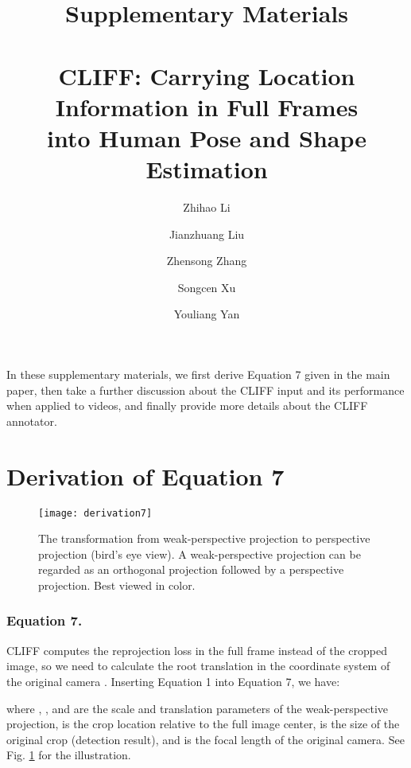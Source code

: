 \documentclass[runningheads]{llncs}
\begin{document}
\title{Supplementary Materials \\
	\scriptsize ~ \\
	\normalsize CLIFF: Carrying Location Information in Full Frames \\
	into Human Pose and Shape Estimation}



\author{
Zhihao Li \and
Jianzhuang Liu \and
Zhensong Zhang \and
Songcen Xu \and
Youliang Yan
}



\maketitle

In these supplementary materials, we first derive Equation 7 given in the main paper, then take a further discussion about the CLIFF input and its performance when applied to videos, and finally provide more details about the CLIFF annotator.

\section{Derivation of Equation 7}

\begin{figure}[t]
	\centering
	\texttt{[image: derivation7]}
	\caption {The transformation from weak-perspective projection to perspective projection (bird's eye view). A weak-perspective projection can be regarded as an orthogonal projection followed by a perspective projection. Best viewed in color.}
	\label{fig:derivation}
\end{figure}

\subsubsection{Equation 7.}
CLIFF computes the reprojection loss in the full frame instead of the cropped image, so we need to calculate the root translation  in the coordinate system of the original camera .
Inserting Equation 1 into Equation 7, we have:

where , , and  are the scale and translation parameters of the weak-perspective projection,  is the crop location relative to the full image center,  is the size of the original crop (detection result), and  is the focal length of the original camera.
See Fig. \ref{fig:derivation} for the illustration.
\end{document}
